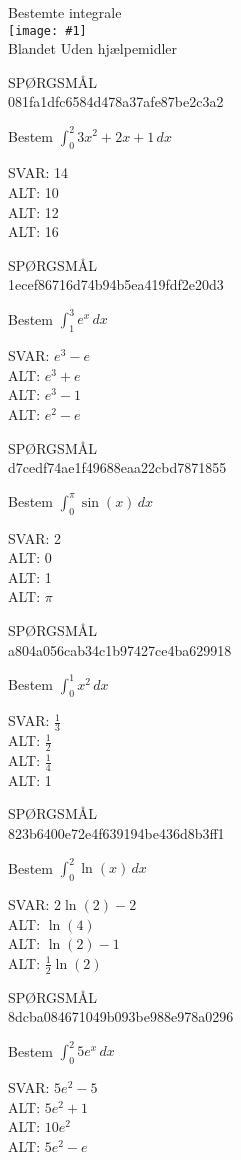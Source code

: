 \documentclass[]{article}
\newcounter{spgcounter}
\newenvironment{question}[2]{\addtocounter{spgcounter}{1} SPØRGSMÅL \thespgcounter\\}{\hspace{50px}}
\newcommand{\name}[1]{{\huge #1}\\}
\newcommand{\tag}[1]{#1}
\newcommand{\cover}[1]{\texttt{[image: \#1]}\\}
\newcommand{\answer}[1]{{\color{green} SVAR: #1}\\}
\newcommand{\alt}[1]{{\color{red} ALT: #1}\\}
\begin{document}
\name{Bestemte integrale}
\cover{bestemteintegrale.png}
\tag{Blandet}
\tag{Uden hjælpemidler}

\begin{question}{multi}\id{081fa1dfc6584d478a37afe87be2c3a2}

Bestem $\int_0^2 3x^2 + 2x + 1 \, dx$

\answer{14}
\alt{10}
\alt{12}
\alt{16}

\end{question}

\begin{question}{multi}\id{1ecef86716d74b94b5ea419fdf2e20d3}

Bestem $\int_1^3 e^x \, dx$

\answer{$e^3 - e$}
\alt{$e^3 + e$}
\alt{$e^3 - 1$}
\alt{$e^2 - e$}

\end{question}

\begin{question}{multi}\id{d7cedf74ae1f49688eaa22cbd7871855}

Bestem $\int_0^{\pi} \sin(x) \, dx$

\answer{2}
\alt{0}
\alt{1}
\alt{$\pi$}

\end{question}

\begin{question}{multi}\id{a804a056cab34c1b97427ce4ba629918}

Bestem $\int_0^1 x^2 \, dx$

\answer{$\frac{1}{3}$}
\alt{$\frac{1}{2}$}
\alt{$\frac{1}{4}$}
\alt{1}

\end{question}

\begin{question}{multi}\id{823b6400e72e4f639194be436d8b3ff1}

Bestem $\int_0^2 \ln(x) \, dx$

\answer{$2\ln(2) - 2$}
\alt{$\ln(4)$}
\alt{$\ln(2) - 1$}
\alt{$\frac{1}{2}\ln(2)$}

\end{question}

\begin{question}{multi}\id{8dcba084671049b093be988e978a0296}

Bestem $\int_0^2 5e^x \, dx$

\answer{$5e^2 - 5$}
\alt{$5e^2 + 1$}
\alt{$10e^2$}
\alt{$5e^2 - e$}

\end{question}
\end{document}
